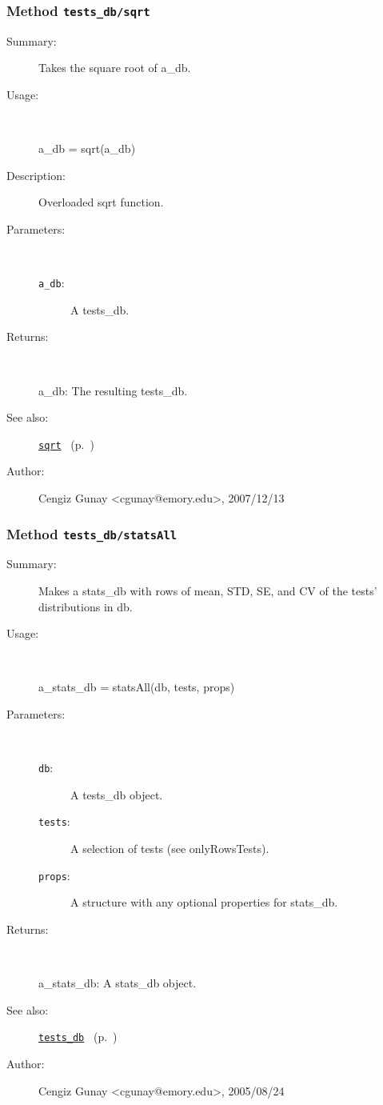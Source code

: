\subsubsection[Method \texttt{sqrt}]{Method \texttt{tests\_db/sqrt}}%
%
\label{ref_tests_db__sqrt}%
\hypertarget{ref_tests_db__sqrt}{}%
\begin{description}
\item[Summary:]Takes the square root of a\_db.
%
\item[Usage:]~%
\begin{lyxcode}%
a\_db = sqrt(a\_db)
%
\end{lyxcode}%
%
\item[Description:]%
Overloaded sqrt function.
\item[Parameters:]~
\begin{description}%
\item[\texttt{a\_db}:]
 A tests\_db.
\end{description}%
%
\item[Returns:
]~

   a\_db: The resulting tests\_db.
%
%
\item[See also:]%
\hyperlink{ref_sqrt}{\texttt{sqrt}}%
\ (p.~\pageref{ref_sqrt})%
%
%
\item[Author:]%
Cengiz Gunay <cgunay@emory.edu>, 2007/12/13
%
\end{description}
\methodline%
\subsubsection[Method \texttt{statsAll}]{Method \texttt{tests\_db/statsAll}}%
%
\label{ref_tests_db__statsAll}%
\hypertarget{ref_tests_db__statsAll}{}%
\begin{description}
\item[Summary:]Makes a stats\_db with rows of mean, STD, SE, and CV of the tests' distributions in db.
%
\item[Usage:]~%
\begin{lyxcode}%
a\_stats\_db = statsAll(db, tests, props)
%
\end{lyxcode}%
%
%
\item[Parameters:]~
\begin{description}%
\item[\texttt{db}:]
 A tests\_db object.
\item[\texttt{tests}:]
 A selection of tests (see onlyRowsTests).
\item[\texttt{props}:]
 A structure with any optional properties for stats\_db.
\end{description}%
%
\item[Returns:
]~

	a\_stats\_db: A stats\_db object.
%
%
\item[See also:]%
\hyperlink{ref_tests_db}{\texttt{tests\_db}}%
\ (p.~\pageref{ref_tests_db})%
%
%
\item[Author:]%
Cengiz Gunay <cgunay@emory.edu>, 2005/08/24
%
\end{description}
\methodline%
